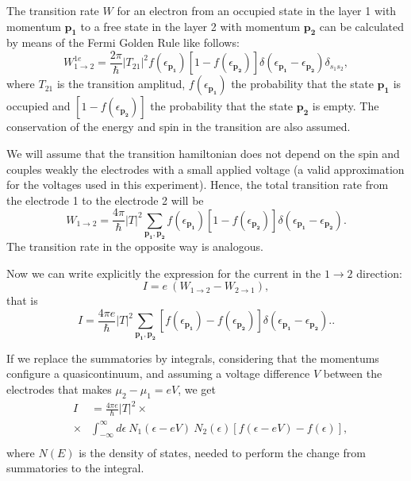 The transition rate $W$ for an electron from an occupied state in the layer 1 with momentum $\mathbf{p_1}$ to a free state in the layer 2 with momentum $\mathbf{p_2}$ can be calculated by means of the Fermi Golden Rule like follows:
\begin{equation}\label{probability1}
W_{1\to 2}^{1e} = \frac{2\pi}{\hbar} |T_{21}|^2 f(\epsilon_{\mathbf{p_1}}) [1-f(\epsilon_{\mathbf{p_2}})]
		\delta(\epsilon_{\mathbf{p_1}}-\epsilon_{\mathbf{p_2}})\delta_{s_1s_2},
\end{equation}
where $T_{21}$ is the transition amplitud, $ f(\epsilon_{\mathbf{p_1}})$ the probability that the state $\mathbf{p_1}$ is occupied and  $[1-f(\epsilon_{\mathbf{p_2}})]$ the probability that the state $\mathbf{p_2}$ is empty. The conservation of the energy and spin in the transition are also assumed. 

We will assume that the transition hamiltonian does not depend on the spin and couples weakly the electrodes with a small applied voltage (a valid approximation for the voltages used in this experiment). Hence, the total transition rate from the electrode 1 to the electrode 2 will be
\begin{equation}\label{probability3}
W_{1\to 2} = \frac{4\pi}{\hbar} |T|^2 \sum_{\mathbf{p_1},\mathbf{p_2}}  
		f(\epsilon_{\mathbf{p_1}}) [1-f(\epsilon_{\mathbf{p_2}})] 
		\delta(\epsilon_{\mathbf{p_1}}-\epsilon_{\mathbf{p_2}}).
\end{equation}
The transition rate in the opposite way is analogous.

Now we can write explicitly the expression for the current in the $1\to 2$ direction:
\begin{equation}\label{current1}
I = e\ (W_{1\to 2} - W_{2\to 1}),
\end{equation}
that is
\begin{equation}\label{current2}
I = \frac{4\pi e}{\hbar} |T|^2 \sum_{\mathbf{p_1},\mathbf{p_2}}  
		[f(\epsilon_{\mathbf{p_1}})-f(\epsilon_{\mathbf{p_2}})] 
		\delta(\epsilon_{\mathbf{p_1}}-\epsilon_{\mathbf{p_2}})..
\end{equation}

If we replace the summatories by integrals, considering that the momentums configure a quasicontinuum, and assuming a voltage difference $V$ between the electrodes that makes $\mu_2-\mu_1=eV$, we get
\begin{eqnarray}\label{current3}
&I& = \frac{4\pi e}{\hbar}  |T|^2 \times
	\nonumber \\
	&\times& \int_{-\infty}^{\infty} d\epsilon\ N_1(\epsilon-eV)\ N_2(\epsilon) [f(\epsilon-eV)-f(\epsilon)],
	\nonumber \\
\end{eqnarray}
where $N(E)$ is the density of states, needed to perform the change from summatories to the integral.

